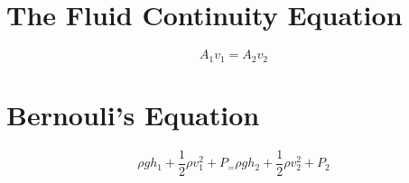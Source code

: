 \section{The Fluid Continuity Equation}
			\begin{mdframed}[backgroundcolor=orange!20!white]
	\begin{equation}
		A_1 v_1 = A_2 v_2
		\label{equation:fluidcontinuity}
	\end{equation}
\end{mdframed}	

\section{Bernouli's Equation}
				\begin{mdframed}[backgroundcolor=orange!20!white]
		\begin{equation}
			\rho g h_1 + \frac{1}{2} \rho v_1^2 + P_ = \rho g h_2 + \frac{1}{2} \rho v_2^2 + P_2
			\label{equation:bernouli}
		\end{equation}
	\end{mdframed}	

